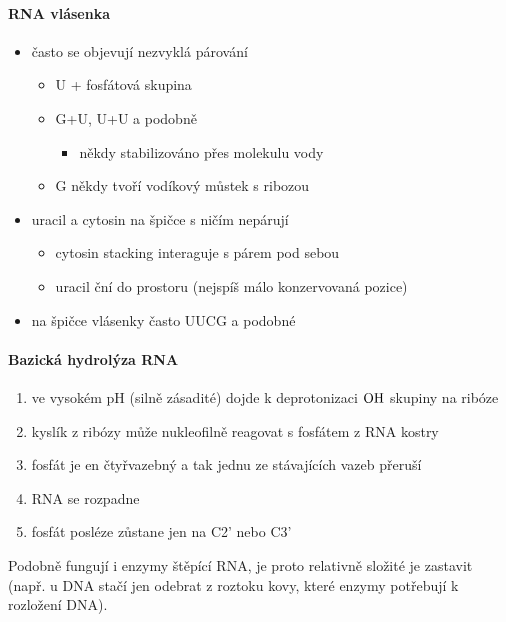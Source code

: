 \documentclass[DIV=8]{scrreprt}
\begin{document}
\paragraph{RNA vlásenka}
\begin{itemize}[nosep]
    \item často se objevují nezvyklá párování
\begin{itemize}[nosep]
    \item U + fosfátová skupina
    \item G+U, U+U a podobně
\begin{itemize}[nosep]
    \item někdy stabilizováno přes molekulu vody
\end{itemize}

    \item G někdy tvoří vodíkový můstek s ribozou
\end{itemize}

    \item uracil a cytosin na špičce s ničím nepárují
\begin{itemize}[nosep]
    \item cytosin stacking interaguje s párem pod sebou
    \item uracil ční do prostoru (nejspíš málo konzervovaná pozice)
\end{itemize}

    \item na špičce vlásenky často UUCG a podobné
\end{itemize}



\paragraph{Bazická hydrolýza RNA}
\begin{enumerate}[nosep]
    \item ve vysokém pH (silně zásadité) dojde k deprotonizaci \(\ce{OH}\) skupiny na ribóze
    \item kyslík z ribózy může nukleofilně reagovat s fosfátem z RNA kostry
    \item fosfát je en čtyřvazebný a tak jednu ze stávajících vazeb přeruší
    \item RNA se rozpadne
    \item fosfát posléze zůstane jen na C2' nebo C3'
\end{enumerate}



Podobně fungují i enzymy štěpící RNA, je proto relativně složité je zastavit (např. u DNA stačí jen odebrat z roztoku kovy, které enzymy potřebují k rozložení DNA).
\end{document}
